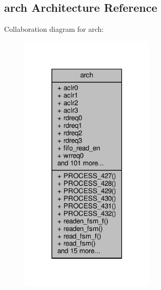 \subsection{arch Architecture Reference}
\label{classtx__pct__data__mimo_1_1arch}


Collaboration diagram for arch\+:\nopagebreak
\begin{figure}[H]
\begin{center}
\leavevmode
\includegraphics[width=182pt]{df/dff/classtx__pct__data__mimo_1_1arch__coll__graph}
\end{center}
\end{figure}
